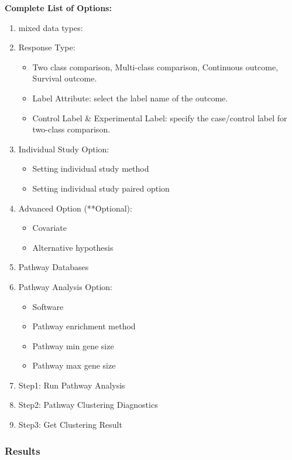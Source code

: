 \textbf{Complete List of Options:} 

\begin{enumerate}
  \item mixed data types:
  \item Response Type:
   \begin{itemize}
     \item Two class comparison, Multi-class comparison, Continuous outcome, Survival outcome.
     \item Label Attribute: select the label name of the outcome.
     \item Control Label \& Experimental Label: specify the case/control label for two-class comparison.
    \end{itemize}
   \item Individual Study Option:
     \begin{itemize}
     \item Setting individual study method
     \item Setting individual study paired option
    \end{itemize} 
   \item Advanced Option (**Optional):
     \begin{itemize}
      \item Covariate
      \item Alternative hypothesis
    \end{itemize} 
    \item Pathway Databases
    \item Pathway Analysis Option:
         \begin{itemize}
       \item Software
      \item Pathway enrichment method
      \item Pathway min gene size
      \item Pathway max gene size
    \end{itemize} 
    \item Step1: Run Pathway Analysis
    \item Step2: Pathway Clustering Diagnostics
    \item Step3: Get Clustering Result
\end{enumerate}


\subsubsection{Results}

